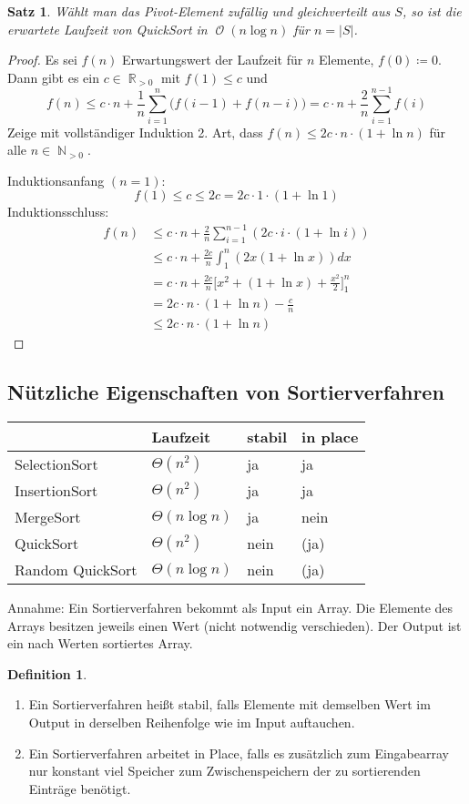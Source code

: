 \documentclass[a4paper,12pt]{article}
\DeclareMathOperator{\N}{\mathbb N}
\DeclareMathOperator{\R}{\mathbb R}
\DeclareMathOperator{\BigO}{\mathcal O}
\newtheorem{satz}[axiom]{Satz}
\theoremstyle{definition}
\newtheorem{definition}[axiom]{Definition}
\begin{document}
	\begin{satz}
		Wählt man das Pivot-Element zufällig und gleichverteilt aus $S$, so ist die erwartete Laufzeit von QuickSort in $\BigO(n \log n)$ für $n = \lvert S\rvert$.
	\end{satz}
	\begin{proof}
		Es sei $f(n)$ Erwartungswert der Laufzeit für $n$ Elemente, $f(0) \coloneq 0$. Dann gibt es ein $c \in \R_{>0}$ mit $f(1) \leq c$ und
		\[
			f(n) \leq c \cdot n + \frac{1}{n} \sum_{i = 1}^{n}\big(f(i - 1) + f(n - i)\big) = c \cdot n + \frac{2}{n}\sum_{i = 1}^{n - 1}f(i)
		\]
		Zeige mit vollständiger Induktion 2. Art, dass $f(n) \leq 2c \cdot n \cdot (1 + \ln n)$ für alle $n \in \N_{>0}$.
		
		Induktionsanfang $(n = 1)$: \[
			f(1) \leq c \leq 2c = 2c \cdot 1 \cdot (1 + \ln 1)
		\]
		Induktionsschluss:
		\begin{align*}
			f(n) 
			&\leq c \cdot n + \frac{2}{n}\sum_{i = 1}^{n - 1}(2c\cdot i \cdot (1 + \ln i))\\
			&\leq c \cdot n + \frac{2c}{n}\int_{1}^{n}(2x(1 + \ln x)) dx\\
			&= c \cdot n + \frac{2c}{n}\Big[x^2 + (1 + \ln x) + \frac{x^2}{2}\Big]_1^n\\
			&= 2c \cdot n \cdot (1 + \ln n) - \frac{c}{n}\\
			&\leq 2c \cdot n \cdot (1 + \ln n)
		\end{align*}
	\end{proof}
	\subsection{Nützliche Eigenschaften von Sortierverfahren}
	\begin{center}
		\begin{tabular}{llll}
			&Laufzeit&stabil&in place\\\hline
			SelectionSort & $\Theta(n^2)$& ja & ja\\
			InsertionSort & $\Theta(n^2)$& ja & ja\\
			MergeSort & $\Theta(n \log n)$ & ja &nein\\
			QuickSort & $\Theta(n^2)$ & nein & (ja)\\
			Random QuickSort & $\Theta(n \log n)$ & nein & (ja)
		\end{tabular}
	\end{center}
	Annahme: Ein Sortierverfahren bekommt als Input ein Array. Die Elemente des Arrays besitzen jeweils einen Wert (nicht notwendig verschieden). Der Output ist ein nach Werten sortiertes Array.
	\begin{definition}
		\begin{enumerate}[label=(\roman*)]
			\item Ein Sortierverfahren heißt stabil, falls Elemente mit demselben Wert im Output in derselben Reihenfolge wie im Input auftauchen.
			\item Ein Sortierverfahren arbeitet in Place, falls es zusätzlich zum Eingabearray nur konstant viel Speicher zum Zwischenspeichern der zu sortierenden Einträge benötigt.
		\end{enumerate}
	\end{definition}
\end{document}
